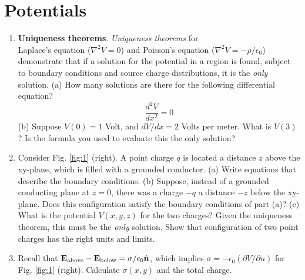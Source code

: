 \documentclass[10pt]{article}
\begin{document}
\section{Potentials}

\begin{enumerate}
\item \textbf{Uniqueness theorems}.  \textit{Uniqueness theorems} for \\ Laplace's equation ($\nabla^2 V=0$) and Poisson's equation ($\nabla^2 V = - \rho/\epsilon_0$) demonstrate that if a solution for the potential in a region is found, subject to boundary conditions and source charge distributions, it is the \textit{only} solution.  (a) How many solutions are there for the following differential equation?
\begin{equation}
\frac{d^2V}{dx^2} = 0
\end{equation}
(b) Suppose $V(0) = 1$ Volt, and $dV/dx = 2$ Volts per meter.  What is $V(3)$?  Is the formula you used to evaluate this the only solution? \\ \vspace{1cm}
\item Consider Fig. \ref{fig:1} (right).  A point charge $q$ is located a distance $z$ above the xy-plane, which is filled with a grounded conductor.  (a) Write equations that describe the boundary conditions. (b) Suppose, instead of a grounded conducting plane at $z=0$, there was a charge $-q$ a distance $-z$ below the xy-plane.  Does this configuration satisfy the boundary conditions of part (a)? (c) What is the potential $V(x,y,z)$ for the two charges?  Given the uniqueness theorem, this must be the \textit{only} solution.  Show that configuration of two point charges has the right units and limits.  \\ \vspace{3cm}
\item Recall that $\mathbf{E}_{\rm above} - \mathbf{E}_{\rm below} = \sigma/\epsilon_0 \hat{\mathbf{n}}$, which implies $\sigma = -\epsilon_0 (\partial V/\partial n)$ for Fig. \ref{fig:1} (right).  Calculate $\sigma(x,y)$ and the total charge.
\end{enumerate}
\end{document}

